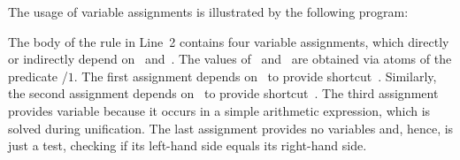 \begin{example}\label{ex:assign}
The usage of variable assignments is illustrated by the following program:%
%
%

%
The body of the rule in Line~2 contains four variable assignments,
which directly or indirectly depend on~ and~.
The values of~ and~ are obtained via atoms of the predicate /$1$.
The first assignment depends on~ to provide shortcut~.
Similarly, the second assignment depends on~ to provide shortcut~.
The third assignment provides variable  because it occurs in a simple arithmetic expression,
which is solved during unification.
The last assignment provides no variables and,
hence, is just a test,
checking if its left-hand side equals its right-hand side.
\eexample
\end{example}

